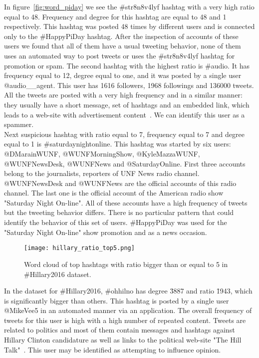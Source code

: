 \documentclass[journal, a4paper, 12pt]{article}
\begin{document}
In figure~\ref{fig:word_piday} we see the \#str8n8v4lyf hashtag with a very high ratio equal to 48. Frequency and degree for this hashtag are equal to 48 and 1 respectively. This hashtag was posted 48 times by different users and is connected only to the \#HappyPiDay hashtag. After the inspection of accounts of these users we found that all of them have a usual tweeting behavior, none of them uses an automated way to post tweets or uses the \#str8n8v4lyf hashtag for promotion or spam. The second hashtag with the highest ratio is \#audio. It has frequency equal to 12, degree equal to one, and it was posted by a single user @audio\_\_agent. This user has 1616 followers, 1968 followings and 136000 tweets. All the tweets are posted with a very high frequency and in a similar manner: they usually have a short message, set of hashtags and an embedded link, which leads to a web-site with advertisement content~\cite{dragplus_audio}. We can identify this user as a spammer. \\

Next suspicious hashtag with ratio equal to 7, frequency equal to 7 and degree equal to 1 is \#saturdaynightonline. This hashtag was started by six users: @DMarainWUNF, @WUNFMorningShow, @KyleMazzaWUNF, @WUNFNewsDesk, @WUNFNews and @SaturdayOnline. First three accounts belong to the journalists, reporters of UNF News radio channel. @WUNFNewsDesk and @WUNFNews are the official accounts of this radio channel. The last one is the official account of the American radio show "Saturday Night On-line".  All of these accounts have a high frequency of tweets but the tweeting behavior differs. There is no particular pattern that could identify the behavior of this set of users. \#HappyPiDay was used for the "Saturday Night On-line" show promotion and as a news occasion.\\


   \begin{figure}[!hbt]
            \begin{center}
            \texttt{[image: hillary\_ratio\_top5.png]}
            \caption{Word cloud of top hashtags with ratio bigger than or equal to 5 in \#Hillary2016 dataset.}
            \label{fig:word_hillary}
            \end{center}
      \end{figure}
    

In the dataset for \#Hillary2016, \#ohhilno has degree \= 3887 and ratio \= 1943, which is significantly bigger than others. This hashtag is posted by a single user @MikeVee5 in an automated manner via an application. The overall frequency of tweets for this user is high with a high number of repeated content. Tweets are related to politics and most of them contain messages and hashtags against Hillary Clinton candidature as well as links to the political web-site "The Hill Talk"~\cite{thehilltalk}. This user may be identified as attempting to influence opinion. \\ 
\end{document}
